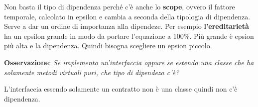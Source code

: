Non basta il tipo di dipendenza perché c’è anche lo \textbf{scope}, ovvero il fattore temporale, calcolato in epsilon e cambia a seconda della tipologia di dipendenza. Serve a dar un ordine di importanza alla dipendeze. Per esempio \textbf{l’ereditarietà} ha un epsilon grande in modo da portare l’equazione a 100\%. Più grande è epsion più alta e  la dipendenza. Quindi bisogna scegliere un epsion piccolo.

\textbf{Osservazione}: \textit{Se implemento un’interfaccia oppure se estendo una classe che ha solamente metodi virtuali puri, che tipo di dipendeza c’è?}

L’interfaccia essendo solamente un contratto non è una classe quindi non c’è dipendenza.
